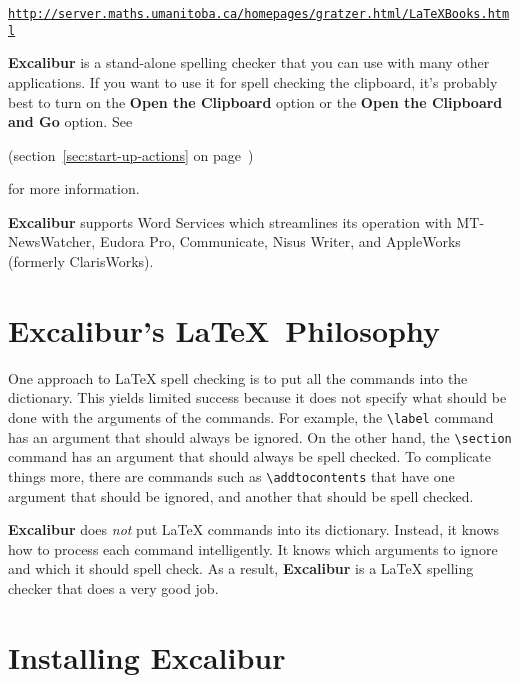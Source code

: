 \documentclass[11pt,titlepage]{article}
\newcommand{\ex}{\textbf{Excalibur}}
\begin{document}
\begin{latexonly}
\begin{alltt}
\url{http://server.maths.umanitoba.ca/homepages/gratzer.html/LaTeXBooks.html}
\end{alltt}
\end{latexonly}

\ex{} is a stand-alone spelling checker that you can use with many
other applications.  If you want to use it for spell checking the
clipboard, it's probably best to turn on the \textbf{Open the
  Clipboard} option or the \textbf{Open the Clipboard and Go} option.
See 
\begin{latexonly}
  (section~\ref{sec:start-up-actions} on
  page~\pageref{sec:start-up-actions})
\end{latexonly}
for more information.

\ex{} supports Word Services which streamlines its operation with
MT-NewsWatcher, Eudora Pro, Communicate, Nisus Writer, and
AppleWorks (formerly ClarisWorks).

\section{Excalibur's \LaTeX\ Philosophy}

One approach to \LaTeX{} spell checking is to put all the commands
into the dictionary. This yields limited success because it does not
specify what should be done with the arguments of the commands. For
example, the \verb+\label+ command has an argument that should always
be ignored. On the other hand, the \verb+\section+ command has an
argument that should always be spell checked. To complicate things
more, there are commands such as \verb+\addtocontents+ that have one
argument that should be ignored, and another that should be spell
checked.

\ex{} does \emph{not} put \LaTeX{} commands into its dictionary.
Instead, it knows how to process each command intelligently. It knows
which arguments to ignore and which it should spell check. As a
result, \ex{} is a \LaTeX{} spelling checker that does a very good
job.

\section{Installing Excalibur}
\end{document}
